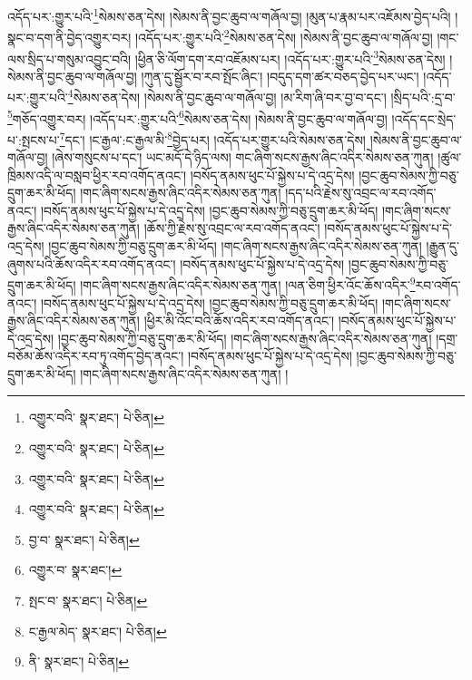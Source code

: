 འདོད་པར་:གྱུར་པའི་\footnote{འགྱུར་བའི་  སྣར་ཐང་།  པེ་ཅིན། }སེམས་ཅན་དེས། །སེམས་ནི་བྱང་ཆུབ་ལ་གཞོལ་བྱ། །མུན་པ་རྣམ་པར་འཇོམས་བྱེད་པའི། །སྣང་བ་དག་ནི་བྱེད་འགྱུར་བར། །འདོད་པར་:གྱུར་པའི་\footnote{འགྱུར་བའི་  སྣར་ཐང་།  པེ་ཅིན། }སེམས་ཅན་དེས། །སེམས་ནི་བྱང་ཆུབ་ལ་གཞོལ་བྱ། །གང་ལས་སྲིད་པ་གསུམ་འབྱུང་བའི། །ཕྱིན་ཅི་ལོག་དག་རབ་འཇོམས་པར། །འདོད་པར་:གྱུར་པའི་\footnote{འགྱུར་བའི་  སྣར་ཐང་།  པེ་ཅིན། }སེམས་ཅན་དེས། །སེམས་ནི་བྱང་ཆུབ་ལ་གཞོལ་བྱ། །ཀུན་དུ་སྦྱོར་བ་རབ་སྤོང་ཞིང་། །བདུད་དག་ཚར་བཅད་བྱེད་པར་ཡང་། །འདོད་པར་:གྱུར་པའི་\footnote{འགྱུར་བའི་  སྣར་ཐང་།  པེ་ཅིན། }སེམས་ཅན་དེས། །སེམས་ནི་བྱང་ཆུབ་ལ་གཞོལ་བྱ། །མ་རིག་ཞི་བར་བྱ་བ་དང་། །སྲིད་པའི་:དྲ་བ་\footnote{བྱ་བ་  སྣར་ཐང་།  པེ་ཅིན། }གཅོད་འགྱུར་བར། །འདོད་པར་:གྱུར་པའི་\footnote{འགྱུར་བ་  སྣར་ཐང་། }སེམས་ཅན་དེས། །སེམས་ནི་བྱང་ཆུབ་ལ་གཞོལ་བྱ། །འདོད་དང་སྲེད་པ་:སྤངས་པ་\footnote{སྤང་བ་  སྣར་ཐང་།  པེ་ཅིན། }དང་། །ང་རྒྱལ་:ང་རྒྱལ་མི་\footnote{ང་རྒྱལ་མེད་  སྣར་ཐང་།  པེ་ཅིན། }བྱེད་པར། །འདོད་པར་གྱུར་པའི་སེམས་ཅན་དེས། །སེམས་ནི་བྱང་ཆུབ་ལ་གཞོལ་བྱ། །ཞེས་གསུངས་པ་དང་། ཡང་མདོ་དེ་ཉིད་ལས། གང་ཞིག་སངས་རྒྱས་ཞིང་འདིར་སེམས་ཅན་ཀུན། །ཚུལ་ཁྲིམས་འདི་ལ་བསླབ་ཕྱིར་རབ་འགོད་ནའང་། །བསོད་ནམས་ཕུང་པོ་སྐྱེས་པ་དེ་འདྲ་དེས། །བྱང་ཆུབ་སེམས་ཀྱི་བཅུ་དྲུག་ཆར་མི་ཕོད། །གང་ཞིག་སངས་རྒྱས་ཞིང་འདིར་སེམས་ཅན་ཀུན། །དད་པའི་རྗེས་སུ་འབྲང་ལ་རབ་འགོད་ནའང་། །བསོད་ནམས་ཕུང་པོ་སྐྱེས་པ་དེ་འདྲ་དེས། །བྱང་ཆུབ་སེམས་ཀྱི་བཅུ་དྲུག་ཆར་མི་ཕོད། །གང་ཞིག་སངས་རྒྱས་ཞིང་འདིར་སེམས་ཅན་ཀུན། །ཆོས་ཀྱི་རྗེས་སུ་འབྲང་ལ་རབ་འགོད་ནའང་། །བསོད་ནམས་ཕུང་པོ་སྐྱེས་པ་དེ་འདྲ་དེས། །བྱང་ཆུབ་སེམས་ཀྱི་བཅུ་དྲུག་ཆར་མི་ཕོད། །གང་ཞིག་སངས་རྒྱས་ཞིང་འདིར་སེམས་ཅན་ཀུན། །རྒྱུན་དུ་ཞུགས་པའི་ཆོས་འདིར་རབ་འགོད་ནའང་། །བསོད་ནམས་ཕུང་པོ་སྐྱེས་པ་དེ་འདྲ་དེས། །བྱང་ཆུབ་སེམས་ཀྱི་བཅུ་དྲུག་ཆར་མི་ཕོད། །གང་ཞིག་སངས་རྒྱས་ཞིང་འདིར་སེམས་ཅན་ཀུན། །ལན་ཅིག་ཕྱིར་འོང་ཆོས་འདིར་\footnote{ནི་  སྣར་ཐང་།  པེ་ཅིན། }རབ་འགོད་ནའང་། །བསོད་ནམས་ཕུང་པོ་སྐྱེས་པ་དེ་འདྲ་དེས། །བྱང་ཆུབ་སེམས་ཀྱི་བཅུ་དྲུག་ཆར་མི་ཕོད། །གང་ཞིག་སངས་རྒྱས་ཞིང་འདིར་སེམས་ཅན་ཀུན། །ཕྱིར་མི་འོང་བའི་ཆོས་འདིར་རབ་འགོད་ནའང་། །བསོད་ནམས་ཕུང་པོ་སྐྱེས་པ་དེ་འདྲ་དེས། །བྱང་ཆུབ་སེམས་ཀྱི་བཅུ་དྲུག་ཆར་མི་ཕོད། །གང་ཞིག་སངས་རྒྱས་ཞིང་འདིར་སེམས་ཅན་ཀུན། །དགྲ་བཅོམ་ཆོས་འདིར་རབ་ཏུ་འགོད་བྱེད་ནའང་། །བསོད་ནམས་ཕུང་པོ་སྐྱེས་པ་དེ་འདྲ་དེས། །བྱང་ཆུབ་སེམས་ཀྱི་བཅུ་དྲུག་ཆར་མི་ཕོད། །གང་ཞིག་སངས་རྒྱས་ཞིང་འདིར་སེམས་ཅན་ཀུན། །
